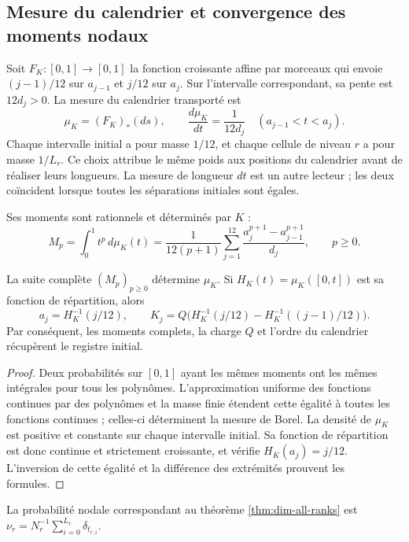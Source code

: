 \subsection{Mesure du calendrier et convergence des moments nodaux}

Soit \(F_K:[0,1]\to[0,1]\) la fonction croissante affine par morceaux
qui envoie \((j-1)/12\) sur \(a_{j-1}\) et \(j/12\) sur \(a_j\).
Sur l’intervalle correspondant, sa pente est \(12d_j>0\).
La mesure du calendrier transporté est
\[
 \mu_K=(F_K)_*(ds),\qquad
 \frac{d\mu_K}{dt}=\frac1{12d_j}\quad
 (a_{j-1}<t<a_j).
\]
Chaque intervalle initial a pour masse \(1/12\), et chaque cellule de niveau
\(r\) a pour masse \(1/L_r\). Ce choix attribue le même poids
aux positions du calendrier avant de réaliser leurs longueurs.
La mesure de longueur \(dt\) est un autre lecteur ; les deux coïncident lorsque
toutes les séparations initiales sont égales.

Ses moments sont rationnels et déterminés par \(K\) :
\begin{equation}
 M_p=\int_0^1t^p\,d\mu_K(t)
   =\frac1{12(p+1)}\sum_{j=1}^{12}
       \frac{a_j^{p+1}-a_{j-1}^{p+1}}{d_j},\qquad p\geq0.
 \label{eq:dim-moments}
\end{equation}
\begin{proposition}
\label{prop:dim-moment-recovery}
La suite complète \((M_p)_{p\geq0}\) détermine \(\mu_K\). Si \(H_K(t)=\mu_K([0,t])\) est sa fonction de répartition, alors
\[
 a_j=H_K^{-1}(j/12),\qquad
 K_j=Q\bigl(H_K^{-1}(j/12)-H_K^{-1}((j-1)/12)\bigr).
\]
Par conséquent, les moments complets, la charge \(Q\) et l’ordre
du calendrier récupèrent le registre initial.
\end{proposition}
\begin{proof}
Deux probabilités sur \([0,1]\) ayant les mêmes moments ont les
mêmes intégrales pour tous les polynômes. L’approximation uniforme
des fonctions continues par des polynômes et la masse finie étendent cette
égalité à toutes les fonctions continues ; celles-ci déterminent la mesure
de Borel. La densité de \(\mu_K\) est positive et constante sur chaque
intervalle initial. Sa fonction de répartition est donc continue et
strictement croissante, et vérifie \(H_K(a_j)=j/12\). L’inversion
de cette égalité et la différence des extrémités prouvent les formules.
\end{proof}

La probabilité nodale correspondant au théorème \ref{thm:dim-all-ranks} est \(\nu_r=N_r^{-1}\sum_{i=0}^{L_r}\delta_{t_{r,i}}\).

